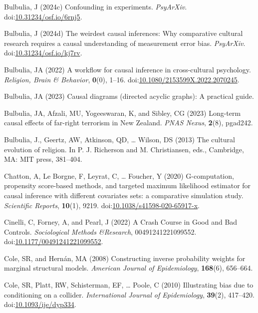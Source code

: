 \documentclass[
  single column]{article}
\newlength{\cslhangindent}
\newenvironment{CSLReferences}[2] %
 {\begin{list}{}{%
  \setlength{\itemindent}{0pt}
  \setlength{\leftmargin}{0pt}
  \setlength{\parsep}{0pt}
  \ifodd #1
   \setlength{\leftmargin}{\cslhangindent}
   \setlength{\itemindent}{-1\cslhangindent}
  \fi
  \setlength{\itemsep}{#2\baselineskip}}}
 {\end{list}}
\begin{document}
\begin{CSLReferences}{1}{0}
Bulbulia, J (2024c) Confounding in experiments. \emph{PsyArXiv}.
doi:\href{https://doi.org/10.31234/osf.io/6rnj5}{10.31234/osf.io/6rnj5}.

Bulbulia, J (2024d) The weirdest causal inferences: Why comparative
cultural research requires a causal understanding of measurement error
bias. \emph{PsyArXiv}.
doi:\href{https://doi.org/10.31234/osf.io/kj7rv}{10.31234/osf.io/kj7rv}.

Bulbulia, JA (2022) A workflow for causal inference in cross-cultural
psychology. \emph{Religion, Brain \& Behavior}, \textbf{0}(0), 1--16.
doi:\href{https://doi.org/10.1080/2153599X.2022.2070245}{10.1080/2153599X.2022.2070245}.

Bulbulia, JA (2023) Causal diagrams (directed acyclic graphs): A
practical guide.

Bulbulia, JA, Afzali, MU, Yogeeswaran, K, and Sibley, CG (2023)
Long-term causal effects of far-right terrorism in {N}ew {Z}ealand.
\emph{PNAS Nexus}, \textbf{2}(8), pgad242.

Bulbulia, J., Geertz, AW, Atkinson, QD, \ldots{} Wilson, DS (2013) The
cultural evolution of religion. In P. J. Richerson and M. Christiansen,
eds., Cambridge, MA: MIT press, 381--404.

Chatton, A, Le Borgne, F, Leyrat, C, \ldots{} Foucher, Y (2020)
G-computation, propensity score-based methods, and targeted maximum
likelihood estimator for causal inference with different covariates
sets: a comparative simulation study. \emph{Scientific Reports},
\textbf{10}(1), 9219.
doi:\href{https://doi.org/10.1038/s41598-020-65917-x}{10.1038/s41598-020-65917-x}.

Cinelli, C, Forney, A, and Pearl, J (2022) A Crash Course in Good and
Bad Controls. \emph{Sociological Methods \&Research}, 00491241221099552.
doi:\href{https://doi.org/10.1177/00491241221099552}{10.1177/00491241221099552}.

Cole, SR, and Hernán, MA (2008) Constructing inverse probability weights
for marginal structural models. \emph{American Journal of Epidemiology},
\textbf{168}(6), 656--664.

Cole, SR, Platt, RW, Schisterman, EF, \ldots{} Poole, C (2010)
Illustrating bias due to conditioning on a collider. \emph{International
Journal of Epidemiology}, \textbf{39}(2), 417--420.
doi:\href{https://doi.org/10.1093/ije/dyp334}{10.1093/ije/dyp334}.


\end{CSLReferences}
\end{document}
